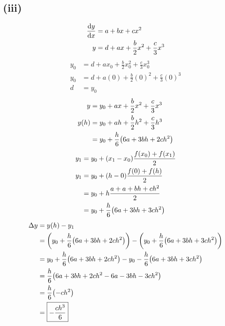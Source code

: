 \documentclass[a4paper,12pt]{article}
\begin{document}
\subsection*{(iii)}
\[\begin{aligned}
	\dv{y}{x}&=a+bx+cx^2\\
	y&=d+ax+\frac b2x^2+\frac c3x^3
\end{aligned}\]
\[\begin{aligned}
	y_0&=d+ax_0+\frac b2x_0^2+\frac c3x_0^3\\
    y_0&=d+a{(0)}+\frac b2{(0)}^2+\frac c3{(0)}^3\\
	d&=y_0
\end{aligned}\]
\[\begin{aligned}
	y&=y_0+ax+\frac b2x^2+\frac c3x^3\\
	y(h)&=y_0+ah+\frac b2h^2+\frac c3h^3\\
	&=y_0+\frac h6\pqty{6a+3bh+2ch^2}
\end{aligned}\]
\[\begin{aligned}
	y_1&=y_0+(x_1-x_0)\frac{f(x_0)+f(x_1)}2\\
	y_1&=y_0+(h-0)\frac{f(0)+f(h)}2\\
	&=y_0+h\frac{a+a+bh+ch^2}2\\
	&=y_0+\frac h6\pqty{6a+3bh+3ch^2}
\end{aligned}\]
\[\begin{aligned}
	\Delta y&=y(h)-y_1\\
	&=\pqty{y_0+\frac h6\pqty{6a+3bh+2ch^2}}-\pqty{y_0+\frac h6\pqty{6a+3bh+3ch^2}}\\
	&=y_0+\frac h6\pqty{6a+3bh+2ch^2}-y_0-\frac h6\pqty{6a+3bh+3ch^2}\\
	&=\frac h6\pqty{6a+3bh+2ch^2-6a-3bh-3ch^2}\\
	&=\frac h6\pqty{-ch^2}\\
	&=\boxed{-\frac{ch^3}6}
\end{aligned}\]
\end{document}

